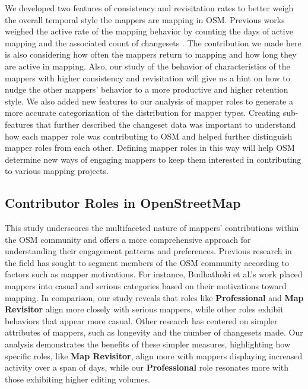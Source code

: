 \documentclass[manuscript,screen,review]{acmart}
\begin{document}
We developed two features of consistency and revisitation rates to better weigh the overall temporal style the mappers are mapping in OSM. Previous works weighed the active rate of the mapping behavior by counting the days of active mapping and the associated count of changesets \cite{Neis17}. The contribution we made here is also considering how often the mappers return to mapping and how long they are active in mapping. Also, our study of the behavior of characteristics of the mappers with higher consistency and revisitation will give us a hint on how to nudge the other mappers’ behavior to a more productive and higher retention style. We also added new features to our analysis of mapper roles to generate a more accurate categorization of the distribution for mapper types. Creating sub-features that further described the changeset data was important to understand how each mapper role was contributing to OSM and helped further distinguish mapper roles from each other. Defining mapper roles in this way will help OSM determine new ways of engaging mappers to keep them interested in contributing to various mapping projects. 

\subsection{Contributor Roles in OpenStreetMap}

This study underscores the multifaceted nature of mappers’ contributions within the OSM community and offers a more comprehensive approach for understanding their engagement patterns and preferences. 
Previous research in the field has sought to segment members of the OSM community according to factors such as mapper motivations. 
For instance, Budhathoki et al.'s work\cite{Budhathoki13} placed mappers into casual and serious categories based on their motivations toward mapping. In comparison, our study reveals that roles like \textbf{Professional} and \textbf{Map Revisitor} align more closely with serious mappers, while other roles exhibit behaviors that appear more casual. 
Other research has centered on simpler attributes of mappers, such as longevity\cite{BeginDR18, Neis12, Neis17} and the number of changesets made\cite{Neis17}. 
Our analysis demonstrates the benefits of these simpler measures, highlighting how specific roles, like \textbf{Map Revisitor}, align more with mappers displaying increased activity over a span of days, while our \textbf{Professional} role resonates more with those exhibiting higher editing volumes. 
\end{document}
